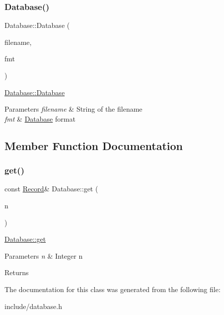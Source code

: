 \subsubsection{\texorpdfstring{Database()}{Database()}}
{\footnotesize\ttfamily Database\+::\+Database (\begin{DoxyParamCaption}\item[{std\+::string}]{filename,  }\item[{D\+B\+Format}]{fmt }\end{DoxyParamCaption})}

\hyperlink{class_database_a0bb07a61d59006f6987bf95e7348a5fa}{Database\+::\+Database}


\begin{DoxyParams}{Parameters}
{\em filename} & String of the filename \\
\hline
{\em fmt} & \hyperlink{class_database}{Database} format \\
\hline
\end{DoxyParams}


\subsection{Member Function Documentation}
\mbox{\label{class_database_a0ef7dce3f4521e498c574447ed4bfb34}} 
\subsubsection{\texorpdfstring{get()}{get()}}
{\footnotesize\ttfamily const \hyperlink{class_database_1_1_record}{Record}\& Database\+::get (\begin{DoxyParamCaption}\item[{int}]{n }\end{DoxyParamCaption})}

\hyperlink{class_database_a0ef7dce3f4521e498c574447ed4bfb34}{Database\+::get}


\begin{DoxyParams}{Parameters}
{\em n} & Integer n \\
\hline
\end{DoxyParams}
\begin{DoxyReturn}{Returns}

\end{DoxyReturn}


The documentation for this class was generated from the following file\+:\begin{DoxyCompactItemize}
\item 
include/database.\+h\end{DoxyCompactItemize}
